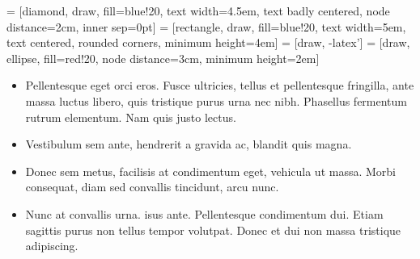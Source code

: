\documentclass[landscape,a0paper,fontscale=0.375]{baposter} %
\newcommand{\compresslist}{ %
\setlength{\itemsep}{1pt}
\setlength{\parskip}{0pt}
\setlength{\parsep}{0pt}
}
\begin{document}
\begin{poster}
{\begin{multicols}{2}

 = [diamond, draw, fill=blue!20, text width=4.5em, text badly centered, node distance=2cm, inner sep=0pt]
 = [rectangle, draw, fill=blue!20, text width=5em, text centered, rounded corners, minimum height=4em]
 = [draw, -latex']
 = [draw, ellipse, fill=red!20, node distance=3cm, minimum height=2em]



\begin{itemize}\compresslist
\item Pellentesque eget orci eros. Fusce ultricies, tellus et pellentesque fringilla, ante massa luctus libero, quis tristique purus urna nec nibh. Phasellus fermentum rutrum elementum. Nam quis justo lectus.
\item Vestibulum sem ante, hendrerit a gravida ac, blandit quis magna.
\item Donec sem metus, facilisis at condimentum eget, vehicula ut massa. Morbi consequat, diam sed convallis tincidunt, arcu nunc.
\item Nunc at convallis urna. isus ante. Pellentesque condimentum dui. Etiam sagittis purus non tellus tempor volutpat. Donec et dui non massa tristique adipiscing.
\end{itemize}

\end{multicols}
}


\end{poster}
\end{document}
